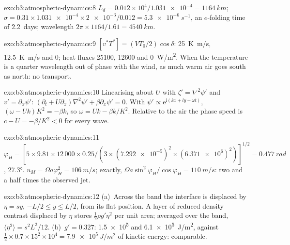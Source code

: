 \begin{solution}{exo:b3:atmospheric-dynamics:8}
$L_d = 0.012\times10^4/\num{1.031e-4} = \qty{1164}{km}$; $\sigma =
0.31\times\num{1.031e-4}\times\num{2e-3}/0.012 = \qty{5.3e-6}{s^{-1}}$, an
$e$-folding time of \num{2.2}~days; wavelength $2\pi\times1164/1.61 =
\qty{4540}{km}$.
\end{solution}

\begin{solution}{exo:b3:atmospheric-dynamics:9}
$[v^*T^*] = (VT_0/2)\cos\delta$: \qty{25}{K.m/s}, \qty{12.5}{K.m/s} and 0;
heat fluxes \num{25100}, \num{12600} and \qty{0}{W/m^2}. When the
temperature is a quarter wavelength out of phase with the wind, as much
warm air goes south as north: no transport.
\end{solution}

\begin{solution}{exo:b3:atmospheric-dynamics:10}
Linearising about $U$ with $\zeta' = \nabla^2\psi'$ and $v' =
\partial_x\psi'$: $(\partial_t + U\partial_x)\nabla^2\psi' + \beta\partial_x
\psi' = 0$. With $\psi' \propto \mathrm e^{\mathrm i(kx + ly - \omega t)}$,
$(\omega - Uk)K^2 = -\beta k$, so $\omega = Uk - \beta k/K^2$. Relative to
the air the phase speed is $c - U = -\beta/K^2 < 0$ for every wave.
\end{solution}

\begin{solution}{exo:b3:atmospheric-dynamics:11}
$\varphi_H = [5\times9.81\times12\,000\times0.25/(3\times(\num{7.292e-5})^2
\times(\num{6.371e6})^2)]^{1/2} = \qty{0.477}{rad}$, \ang{27.3}.
$u_M = \Omega a\varphi_H^2 = \qty{106}{m/s}$; exactly, $\Omega a\sin^2
\varphi_H/\cos\varphi_H = \qty{110}{m/s}$: two and a half times the
observed jet.
\end{solution}

\begin{solution}{exo:b3:atmospheric-dynamics:12}
(a)~Across the band the interface is displaced by $\eta = sy$, $-L/2 \le y
\le L/2$, from its flat position. A layer of reduced density contrast
displaced by $\eta$ stores $\tfrac12\rho g'\eta^2$ per unit area; averaged
over the band, $\langle\eta^2\rangle = s^2L^2/12$. (b)~$g' = 0.327$:
\num{1.5e5} and \qty{6.1e5}{J/m^2}, against $\tfrac12\times0.7\times15^2
\times10^4 = \qty{7.9e5}{J/m^2}$ of kinetic energy: comparable.
\end{solution}

